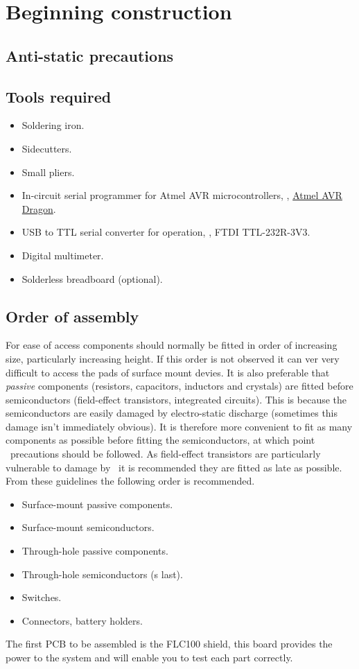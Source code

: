 \chapter{Beginning construction}

\section{Anti-static precautions}

\section{Tools required}

\begin{itemize}
\item Soldering iron.
\item Sidecutters.
\item Small pliers.
\item In-circuit serial programmer for Atmel AVR microcontrollers,
  \eg, \href{http://www.atmel.com/tools/AVRDRAGON.aspx}{Atmel AVR Dragon}.
\item USB to TTL serial converter for  operation, \eg, FTDI
  TTL-232R-3V3.
\item Digital multimeter.
\item Solderless breadboard (optional).
\end{itemize}

\section{Order of assembly}

For ease of access components should normally be fitted in order of
increasing size, particularly increasing height. If this order is not
observed it can ver very difficult to access the pads of surface mount
devies. It is also preferable that \emph{passive} components
(resistors, capacitors, inductors and crystals) are fitted before
semiconductors (field-effect transistors, integreated circuits). This
is because the semiconductors are easily damaged by electro-static
discharge (sometimes this damage isn't immediately obvious). It is
therefore more convenient to fit as many components as possible before
fitting the semiconductors, at which point \esd\ precautions should be
followed. As field-effect transistors are particularly vulnerable to
damage by \esd\ it is recommended they are fitted as late as possible.
From these guidelines the following order is recommended.
\begin{itemize}
\item Surface-mount passive components.
\item Surface-mount semiconductors.
\item Through-hole passive components.
\item Through-hole semiconductors (\fet s last).
\item Switches.
\item Connectors, battery holders.
\end{itemize}

The first PCB to be assembled is the FLC100 shield, this board
provides the power to the system and will enable you to test each part
correctly.
